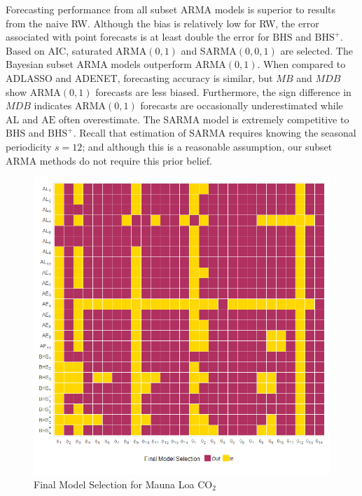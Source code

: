 Forecasting performance from all subset ARMA models is superior to results from the naive RW. Although the bias is relatively low for RW, the error associated with point forecasts is at least double the error for $\textrm{BHS}$ and $\textrm{BHS}^+$. Based on AIC, saturated ARMA$(0,1)$ and SARMA$(0,0,1)$ are selected. The Bayesian subset ARMA models outperform ARMA$(0,1)$. When compared to ADLASSO and ADENET, forecasting accuracy is similar, but $MB$ and $MDB$ show ARMA$(0,1)$ forecasts are less biased. Furthermore, the sign difference in $MDB$ indicates ARMA$(0,1)$ forecasts are occasionally underestimated while $\textrm{AL}$ and $\textrm{AE}$ often overestimate. The SARMA model is extremely competitive to $\textrm{BHS}$ and $\textrm{BHS}^+$. Recall that estimation of SARMA requires knowing the seasonal periodicity $s=12$; and although this is a reasonable assumption, our subset ARMA methods do not require this prior belief.

\begin{figure}[htbp]
	\caption{Final Model Selection for Mauna Loa $\textrm{CO}_2$ }
	\center
	\label{fig:maunaloaselect}
	\includegraphics[scale=0.42]{maunaloaselect}
\end{figure}

